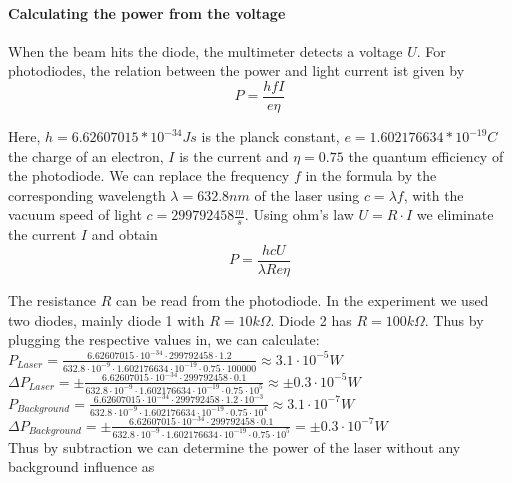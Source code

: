 \documentclass{article}
\begin{document}
\paragraph{Calculating the power from the voltage}

When the beam hits the diode, the multimeter detects a voltage $U$. For photodiodes, the relation between the power and light current ist given by 
\cite{Quantenausbeute} 
\begin{equation} 
P = \frac{hfI}{e\eta}
\end{equation}
 
Here, $h = 6.62607015*10^{-34} Js$ is the planck constant, $e = 1.602176634*10^{-19} C$ the charge of an electron, $I$ is the current and $\eta = 0.75$ the quantum efficiency of the photodiode. We can replace the frequency $f$ in the formula by the corresponding wavelength $\lambda = 632.8 nm$ of the laser using $c= \lambda f$, with the vacuum speed of light  $c = 299792458 \frac{m}{s}$. Using ohm's law $ U= R \cdot I$ we eliminate the current $I$ and obtain 
\begin{equation}
P = \frac{hcU}{\lambda Re \eta}
\label{powerfromvoltage}
\end{equation}

The resistance $R$ can be read from the photodiode. In the experiment we used two diodes, mainly diode 1 with $R=10 k\Omega$. Diode 2 has $R= 100 k\Omega$. Thus by plugging the respective values in, we can calculate:\\

$P_{Laser} =  \frac{6.62607015\cdot10^{-34}\cdot299792458\cdot1.2}{632.8\cdot10^{-9}\cdot1.602176634\cdot10^{-19}\cdot0.75\cdot100000}\approx3.1\cdot10^{-5} W$\\


$\Delta P_{Laser}= \pm \frac{6.62607015\cdot10^{-34}\cdot299792458\cdot0.1}{632.8\cdot10^{-9}\cdot1.602176634\cdot10^{-19}\cdot0.75\cdot10^{5}}\approx\pm 0.3\cdot10^{-5} W$\\

$P_{Background} =  \frac{6.62607015\cdot10^{-34}\cdot299792458\cdot1.2\cdot10^{-3}}{632.8\cdot10^{-9}\cdot1.602176634\cdot10^{-19}\cdot0.75\cdot10^{4}}\approx3.1\cdot10^{-7}W $\\

$\Delta P_{Background} = \pm \frac{6.62607015\cdot10^{-34}\cdot299792458\cdot0.1}{632.8\cdot10^{-9}\cdot1.602176634\cdot10^{-19}\cdot0.75\cdot10^{5}} =\pm 0.3\cdot10^{-7}W$\\

Thus by subtraction we can determine the power of the laser without any background influence as\\
\end{document}
